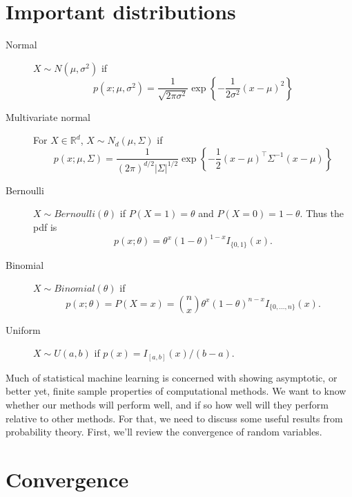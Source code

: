 \documentclass[10pt]{article}
\newcommand{\R}{\mathbb{R}}
\begin{document}
\section{Important distributions}
\label{sec:import-distr}

\begin{description}
\item[Normal] $X\sim N(\mu,\sigma^2)$ if
  \begin{equation}
    \label{eq:7}
    p(x;\mu,\sigma^2) =
    \frac{1}{\sqrt{2\pi\sigma^2}}\exp\left\{-\frac{1}{2\sigma^2}(x-\mu)^2\right\} 
  \end{equation}
\item[Multivariate normal] For $X\in \R^d$, $X\sim N_d(\mu, \Sigma)$ if
  \begin{equation}
    \label{eq:15}
    p(x;\mu,\Sigma) = \frac{1}{(2\pi)^{d/2}|\Sigma|^{1/2}}\exp\left\{-\frac{1}{2}(x-\mu)^\top\Sigma^{-1}(x-\mu)\right\} 
  \end{equation}
\item[Bernoulli] $X\sim Bernoulli(\theta)$ if $P(X=1)=\theta$ and
  $P(X=0) = 1-\theta$. Thus the pdf is
  \begin{equation}
    \label{eq:16}
    p(x;\theta) = \theta^x(1-\theta)^{1-x} I_{\{0,1\}}(x).
  \end{equation}
\item[Binomial] $X\sim Binomial(\theta)$ if
  \begin{equation}
    \label{eq:17}
    p(x;\theta) = P(X=x) = \binom{n}{x}\theta^x(1-\theta)^{n-x}I_{\{0,\ldots,n\}}(x).
  \end{equation}
\item[Uniform] $X\sim U(a,b)$ if $p(x) = I_{[a,b]}(x)/(b-a).$
\end{description}


Much of statistical machine learning is concerned with showing
asymptotic, or better yet, finite sample properties of computational
methods. We want to know whether our methods will perform well, and if
so how well will they perform relative to other methods. For that, we
need to discuss some useful results from probability theory. First,
we'll review the convergence of random variables.

\section{Convergence}
\label{sec:convergence}
\end{document}
